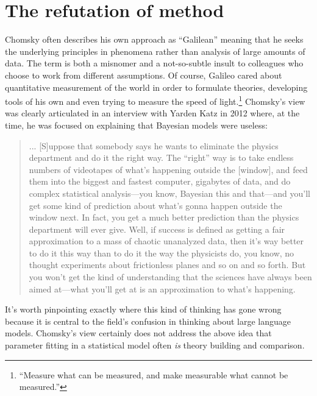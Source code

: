 \documentclass[output=paper,colorlinks,citecolor=brown
]{langscibook}
\begin{document}

\section{The refutation of method}

Chomsky often describes his own approach as ``Galilean'' meaning that he seeks the underlying principles in phenomena rather than analysis of large amounts of data. The term is both a misnomer \citep{behme2014galilean} and a not-so-subtle insult to colleagues who choose to work from different assumptions. Of course,  Galileo cared about quantitative measurement of the world in order to formulate theories, developing tools of his own and even trying to measure the speed of light.\footnote{ ``Measure what can be measured, and make measurable what cannot be measured.''} Chomsky's view was clearly articulated in an interview with Yarden Katz in 2012 where, at the time, he was focused on explaining that Bayesian models were useless: 
\begin{quote}
... [S]uppose that somebody says he wants to eliminate the physics department and do it the right way. The ``right'' way is to take endless numbers of videotapes of what's happening outside the [window], and feed them into the biggest and fastest computer, gigabytes of data, and do complex statistical analysis---you know, Bayesian this and that---and you'll get some kind of prediction about what's gonna happen outside the window next. In fact, you get a much better prediction than the physics department will ever give. Well, if success is defined as getting a fair approximation to a mass of chaotic unanalyzed data, then it's way better to do it this way than to do it the way the physicists do, you know, no thought experiments about frictionless planes and so on and so forth. But you won't get the kind of understanding that the sciences have always been aimed at—what you'll get at is an approximation to what's happening.
\end{quote}
It's worth pinpointing exactly where this kind of thinking has gone wrong because it is central to the field's confusion in thinking about large language models. Chomsky's view certainly does not address the above idea that parameter fitting in a statistical model often \emph{is} theory building and comparison. %
\end{document}
